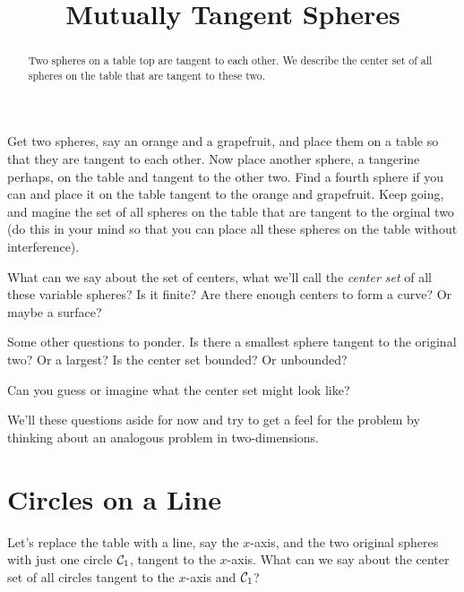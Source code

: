 \documentclass{ximera}
\title{Mutually Tangent Spheres}
\begin{document}
\begin{abstract}
Two spheres on a table top are tangent to each other. We describe the center set of all spheres on the table that are tangent to these two. 
\end{abstract}
\maketitle

Get two spheres, say an orange and a grapefruit, and place them on a table so that they are tangent to each other. Now place another sphere, a tangerine perhaps, on the table and tangent to the other two. Find a fourth sphere if you can and place it on the table tangent to the orange and grapefruit. Keep going, and magine the set of all spheres on the table that are tangent to the orginal two (do this in your mind so that you can place all these spheres on the table without interference). 

What can we say about the set of centers, what we'll call the \emph{center set} of all these variable spheres? Is it finite? Are there enough centers to form a curve? Or maybe a surface?

Some other questions to ponder. Is there a smallest sphere tangent to the original two? Or a largest? Is the center set bounded? Or unbounded?

Can you guess or imagine what the center set might look like?

We'll these questions aside for now and try to get a feel for the problem by thinking about an analogous problem in two-dimensions.

\section{Circles on a Line}
\begin{exploration}
Let's replace the table with a line, say the $x$-axis, and the two original spheres with just one circle ${\cal C}_1$, tangent to the $x$-axis. What can we say about the center set of all circles tangent to the $x$-axis and ${\cal C}_1$?

 
\begin{onlineOnly}
    \begin{center}
\end{center}
\end{onlineOnly}
\end{exploration}
\end{document}
